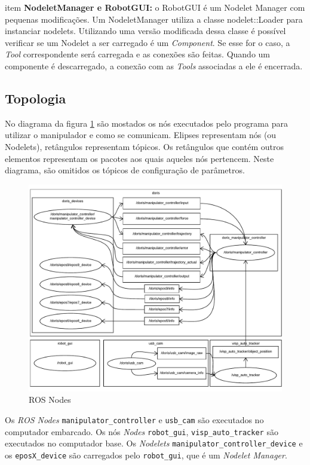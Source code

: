 \begin{itemize}
item \textbf{NodeletManager e RobotGUI:} o RobotGUI é um Nodelet Manager com pequenas modificações. Um NodeletManager utiliza a classe nodelet::Loader para instanciar nodelets. Utilizando uma versão modificada dessa classe é possível verificar se um Nodelet a ser carregado é um \textit{Component}. Se esse for o caso, a \textit{Tool} correspondente será carregada e as conexões são feitas. Quando um componente é descarregado, a conexão com as \textit{Tools} associadas a ele é encerrada.
\end{itemize}


\subsection{Topologia}

No diagrama da figura \ref{fig:ros_nodes} são mostados os nós executados pelo programa para utilizar o manipulador e como se comunicam. Elipses representam nós (ou Nodelets), retângulos representam tópicos. Os retângulos que contém outros elementos representam os pacotes aos quais aqueles nós pertencem. Neste diagrama, são omitidos os tópicos de configuração de parâmetros.

\begin{figure}[!h]
  \centering
  \includegraphics[width=\linewidth]{./img/node_diagram}
  \caption{ROS Nodes}
  \label{fig:ros_nodes}
\end{figure}

Os \textit{ROS Nodes} \verb|manipulator_controller| e \verb|usb_cam| são executados no computador embarcado. Os nós \textit{Nodes} \verb|robot_gui|, \verb|visp_auto_tracker| são executados no computador base. Os \textit{Nodelets} \verb|manipulator_controller_device| e os \verb|eposX_device| são carregados pelo \verb|robot_gui|, que é um \textit{Nodelet Manager}. 

